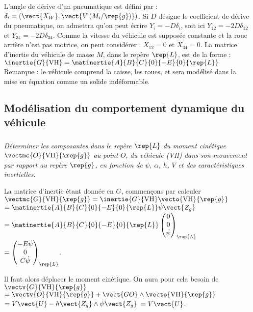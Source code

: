 \begin{multicols}{2}
L’angle de dérive d’un pneumatique est défini par : $\delta_i=\left(\vect{X_W},\vect{V\left(M_i / \rep{g} \right)}\right)$. Si
$D$ désigne le coefficient de dérive du pneumatique, on admettra qu’on peut écrire $Y_i = - D\delta_i$, soit ici $Y_{12}=-2D\delta_{12}$ et $Y_{34}=-2D\delta_{34}$.
Comme la vitesse du véhicule est supposée constante et la roue arrière n’est pas motrice, on peut considérer : $X_{12}=0$ et $X_{34}=0$.
La matrice d’inertie du véhicule de masse $M$, dans le repère $\rep{L}$, est de la
forme : $\inertie{G}{\text{VH}}=\matinertie{A}{B}{C}{0}{-E}{0}{\rep{L}}$
Remarque : le véhicule comprend la caisse, les roues, et sera modélisé
dans la mise en équation comme un solide indéformable.


\subsection*{Modélisation du comportement dynamique du véhicule}

\subparagraph{}\textit{Déterminer les composantes dans le repère $\rep{L}$ du moment cinétique
$\vectmc{O}{\text{VH}}{\rep{g}}$ au point $O$, du véhicule (VH) dans son mouvement par rapport au repère $\rep{g}$, en fonction de $\dot{\psi}$, $\alpha$, $h$, $V$ et des caractéristiques inertielles.}
\ifprof
\begin{corrige}

La matrice d'inertie étant donnée en $G$, commençons par calculer 
$\vectmc{G}{\text{VH}}{\rep{g}} = \inertie{G}{\text{VH}} \vecto{\text{VH}}{\rep{g}} $
$ =\matinertie{A}{B}{C}{0}{-E}{0}{\rep{L}} \dot{\psi}\vect{Z_g} $
$ =\matinertie{A}{B}{C}{0}{-E}{0}{\rep{L}} \begin{pmatrix} 0 \\ 0 \\ \dot{\psi} \end{pmatrix}_{\rep{L}} $
$ =  \begin{pmatrix} -E\dot{\psi} \\ 0 \\ C\dot{\psi} \end{pmatrix}_{\rep{L}} $.

Il faut alors déplacer le moment cinétique. On aura pour cela besoin de $\vectv{G}{\text{VH}}{\rep{g}} $
$= \vectv{O}{\text{VH}}{\rep{g}} + \vect{GO}\wedge  \vecto{\text{VH}}{\rep{g}}$
$ = V\vect{U}-h\vect{Z_g} \wedge  \dot{\psi}\vect{Z_g} $
$ = V\vect{U}$.


\end{corrige}
\end{multicols}
